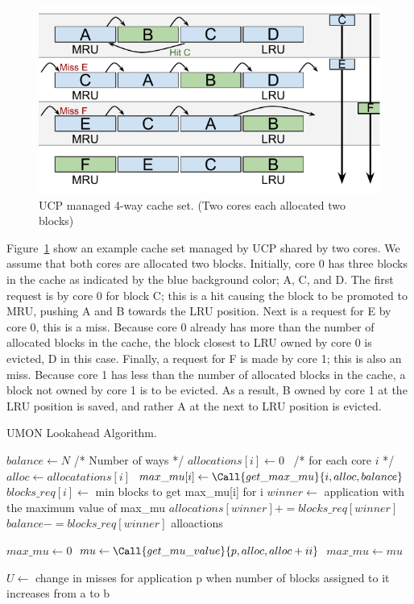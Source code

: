 \begin{figure}[ht]
    \centering
    \includegraphics[width=.65\textwidth]{figures/algorithms/UCP}
    \caption[UCP managed 4-way cache set.]{UCP managed 4-way cache set. (Two cores each allocated two blocks)}
    \label{fig:algorithms:ucp_example}
\end{figure}

Figure~\ref{fig:algorithms:ucp_example} show an example cache set managed by UCP shared by two cores.
We assume that both cores are allocated two blocks.
Initially, core 0 has three blocks in the cache as indicated by the blue background color; A, C, and D.
The first request is by core 0 for block C; this is a hit causing the block to be promoted to MRU, pushing A and B towards the LRU position.
Next is a request for E by core 0, this is a miss.
Because core 0 already has more than the number of allocated blocks in the cache, the block closest to LRU owned by core 0 is evicted, D in this case.
Finally, a request for F is made by core 1; this is also an miss.
Because core 1 has less than the number of allocated blocks in the cache, a block not owned by core 1 is to be evicted.
As a result, B owned by core 1 at the LRU position is saved, and rather A at the next to LRU position is evicted.



\begin{algorithm}[ht]
\caption{UMON Lookahead Algorithm.}
\label{alg:algorithms:ucp}
\begin{algorithmic}[1]
\State $balance\gets N$ /* Number of ways */
\State $allocations[i]\gets 0$  /* for each core $i$ */
        \State $alloc\gets allocatations[i]$
        \State $max\_mu[i]\gets \Call{get\_max\_mu}{i, alloc, balance}$
        \State $blocks\_req[i]\gets$ min blocks to get max\_mu[i] for i
    \EndFor
    \State $winner\gets$ application with the maximum value of max\_mu
    \State $allocations[winner] += blocks\_req[winner]$
    \State $balance -= blocks\_req[winner]$
\EndWhile
\State \Return alloactions
\State

    \State $max\_mu\gets 0$
        \State $mu\gets \Call{get\_mu\_value}{p, alloc, alloc+ii}$
            \State $max\_mu\gets mu$
        \EndIf
    \EndFor
    \State {}
\EndFunction
\State

    \State $U\gets$ change in misses for application p when number of blocks assigned to it increases from a to b
    \State {}
\EndFunction
\end{algorithmic}
\end{algorithm}
